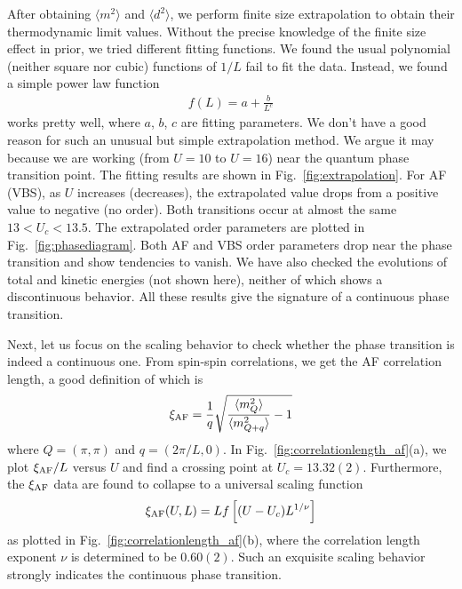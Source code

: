 \documentclass[twocolumn,superscriptaddress]{revtex4-1}
\begin{document}
After obtaining $\langle m^2 \rangle$ and $\langle d^2 \rangle$, we perform finite size extrapolation to obtain their thermodynamic limit values. Without the precise knowledge of the finite size effect in prior, we tried different fitting functions. We found the usual polynomial (neither square nor cubic) functions of $1/L$ fail to fit the data. Instead, we found a simple power law function
\begin{eqnarray}\label{eq:fitting}
f(L)=a+\frac{b}{L^c}
\end{eqnarray}
works pretty well, where $a$, $b$, $c$ are fitting parameters. We don't have a good reason for such an unusual but simple extrapolation method. We argue it may because we are working (from $U=10$ to $U=16$) near the quantum phase transition point. The fitting results are shown in Fig.~\ref{fig:extrapolation}. For AF (VBS), as $U$ increases (decreases), the extrapolated value drops from a positive value to negative (no order). Both transitions occur at almost the same $13<U_c<13.5$. The extrapolated order parameters are plotted in Fig.~\ref{fig:phasediagram}. Both AF and VBS order parameters drop near the phase transition and show tendencies to vanish. We have also checked the evolutions of total and kinetic energies (not shown here), neither of which shows a discontinuous behavior. All these results give the signature of a continuous phase transition.





Next, let us focus on the scaling behavior to check whether the phase transition is indeed a continuous one. From spin-spin correlations, we get the AF correlation length, a good definition of which is \cite{Sandvik_ACP_2010}
\begin{eqnarray}
  \xi_{\rm AF}=\frac{1}{q}\sqrt{\frac{\langle m_Q^2 \rangle}{\langle m_{Q+q}^2 \rangle}-1}
\end{eqnarray}
where $Q=(\pi,\pi)$ and $q=(2\pi/L,0)$. In Fig.~\ref{fig:correlationlength_af}(a), we plot $\xi_{\rm AF}/L$ versus $U$ and find a crossing point at $U_c=13.32(2)$. Furthermore, the $\xi_{\rm AF}$ data are found to collapse to a universal scaling function
\begin{eqnarray}\label{eq:scalinghypothesis}
  \xi_{\rm AF}(U,L)=L f\left[(U-U_c)L^{1/\nu}\right] 
\end{eqnarray}
as plotted in Fig.~\ref{fig:correlationlength_af}(b), where the correlation length exponent $\nu$ is determined to be $0.60(2)$. Such an exquisite scaling behavior strongly indicates the continuous phase transition. 
\end{document}
